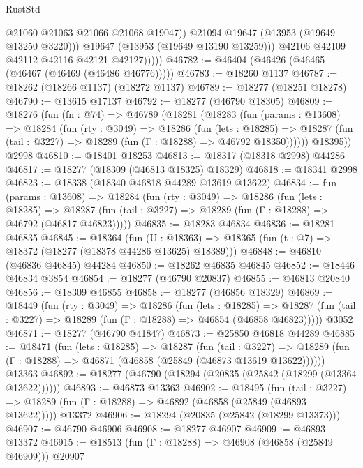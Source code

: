\begin{lexlean}{RustStd}
\begin{coremodule}
                      @21060
                      @21063
                      @21066
                      @21068
                      @19047))
                  @21094
                  @19647
                  (@13953 (@19649 @13250 @3220)))
                @19647
                (@13953 (@19649 @13190 @13259)))
              @42106
              @42109
              @42112
              @42116
              @42121
              @42127)))))
@46782 := @46404 (@46426 (@46465 (@46467 (@46469 (@46486 @46776)))))
@46783 := @18260 @1137
@46787 := @18262 (@18266 @1137) (@18272 @1137)
@46789 := @18277 (@18251 @18278)
@46790 := @13615 @17137
@46792 := @18277 (@46790 @18305)
@46809 := @18276
    (fun (fn : @74) =>
    @46789
      (@18281
        (@18283
          (fun (params : @13608) =>
          @18284
            (fun (rty : @3049) =>
            @18286
              (fun (lets : @18285) =>
              @18287 (fun (tail : @3227) => @18289 (fun (Γ : @18288) => @46792 @18350))))))
        @18395))
    @2998
@46810 := @18401 @18253
@46813 := @18317 (@18318 @2998) @44286
@46817 := @18277 (@18309 (@46813 @18325) @18329)
@46818 := @18341 @2998
@46823 := @18338 (@18340 @46818 @44289 @13619 @13622)
@46834 := fun (params : @13608) =>
  @18284
    (fun (rty : @3049) =>
    @18286
      (fun (lets : @18285) =>
      @18287 (fun (tail : @3227) => @18289 (fun (Γ : @18288) => @46792 (@46817 @46823)))))
@46835 := @18283 @46834
@46836 := @18281 @46835
@46845 := @18364
    (fun (U : @18363) => @18365 (fun (t : @7) => @18372 (@18277 (@18378 @44286 @13625) @18389)))
@46848 := @46810 (@46836 @46845) @44284
@46850 := @18262 @46835 @46845
@46852 := @18446 @46834 @3854
@46854 := @18277 (@46790 @20837)
@46855 := @46813 @20840
@46856 := @18309 @46855
@46858 := @18277 (@46856 @18329)
@46869 := @18449
    (fun (rty : @3049) =>
    @18286
      (fun (lets : @18285) =>
      @18287 (fun (tail : @3227) => @18289 (fun (Γ : @18288) => @46854 (@46858 @46823)))))
    @3052
@46871 := @18277 (@46790 @41847)
@46873 := @25850 @46818 @44289
@46885 := @18471
    (fun (lets : @18285) =>
    @18287
      (fun (tail : @3227) =>
      @18289 (fun (Γ : @18288) => @46871 (@46858 (@25849 (@46873 @13619 @13622))))))
    @13363
@46892 := @18277 (@46790 (@18294 (@20835 (@25842 (@18299 (@13364 @13622))))))
@46893 := @46873 @13363
@46902 := @18495
    (fun (tail : @3227) => @18289 (fun (Γ : @18288) => @46892 (@46858 (@25849 (@46893 @13622)))))
    @13372
@46906 := @18294 (@20835 (@25842 (@18299 @13373)))
@46907 := @46790 @46906
@46908 := @18277 @46907
@46909 := @46893 @13372
@46915 := @18513 (fun (Γ : @18288) => @46908 (@46858 (@25849 @46909))) @20907

\end{coremodule}
\end{lexlean}
